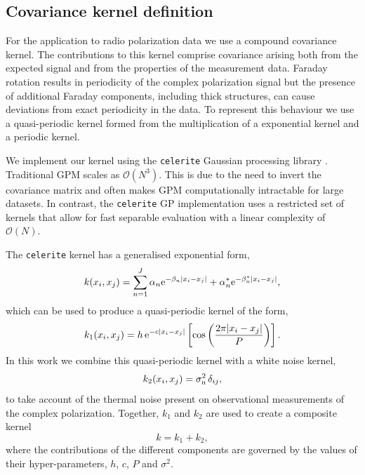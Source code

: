 \documentclass[fleqn,usenatbib]{mnras}
\begin{document}
%
%


\subsection{Covariance kernel definition}
\label{sec:kernels}

For the application to radio polarization data we use a compound covariance kernel. The contributions to this kernel comprise covariance arising both from the expected signal and from the properties of the measurement data. Faraday rotation results in periodicity of the complex polarization signal but the presence of additional Faraday components, including thick structures, can cause deviations from exact periodicity in the data. To represent this behaviour we use a quasi-periodic kernel formed from the multiplication of a exponential kernel and a periodic kernel.

We implement our kernel using the {\tt celerite} Gaussian processing library \citep{celerite}. Traditional GPM scales as $\mathcal{O}(N^3)$. This is due to the need to invert the covariance matrix and often makes GPM computationally intractable for large datasets. In contrast,  the {\tt celerite} GP implementation uses a restricted set of kernels that allow for fast separable evaluation with a linear complexity of $\mathcal{O}(N)$.

The {\tt celerite} kernel has a generalised exponential form,
%
\begin{equation}
    k(x_i,x_j) = \sum_{n=1}^{J}{\alpha_n {\rm e}^{-\beta_n |x_i - x_j|} + \alpha_n^{\ast} {\rm e}^{-\beta_n^{\ast} |x_i - x_j|}},
\end{equation}
%
which can be used to produce a quasi-periodic kernel of the form,
%
\begin{equation}
\label{eq:celkernel}
k_1(x_i,x_j)=h\,{\rm e}^{-c|x_i - x_j|}\left[\cos\left(\frac{2\pi|x_i - x_j|}{P}\right)\right].
\end{equation}
%
In this work we combine this quasi-periodic kernel with a white noise kernel,
%
\begin{equation}
\label{eq:whitekernel}
k_2(x_i,x_j)=\sigma_{\rm n}^2\,\delta_{ij},
\end{equation}
%
to take account of the thermal noise present on observational measurements of the complex polarization. Together, $k_1$ and $k_2$ are used to create a composite kernel
%
\begin{equation}
k = k_1 + k_2,
\end{equation}
%
where the contributions of the different components are governed by the values of their hyper-parameters, $h$, $c$, $P$ and $\sigma^2$.
\end{document}
